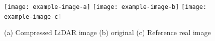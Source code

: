 \documentclass[colorinlistoftodos]{article} %
\begin{document}
\begin{figure}
    \centering
    \texttt{[image: example-image-a]}
    \texttt{[image: example-image-b]}
    \texttt{[image: example-image-c]}

    \caption{(a) Compressed LiDAR image (b) original (c) Reference real image}
    \label{fig:lidar_qualitative}
\end{figure}



\end{document}
